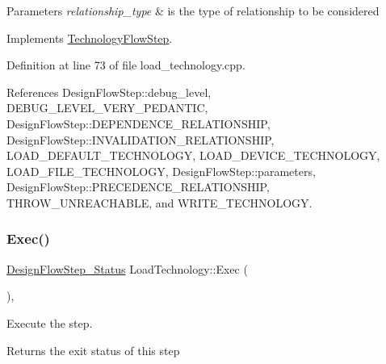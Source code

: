 \begin{DoxyParams}{Parameters}
{\em relationship\+\_\+type} & is the type of relationship to be considered \\
\hline
\end{DoxyParams}


Implements \hyperlink{classTechnologyFlowStep_ab543169c9b0143c8ae8831d765519075}{Technology\+Flow\+Step}.



Definition at line 73 of file load\+\_\+technology.\+cpp.



References Design\+Flow\+Step\+::debug\+\_\+level, D\+E\+B\+U\+G\+\_\+\+L\+E\+V\+E\+L\+\_\+\+V\+E\+R\+Y\+\_\+\+P\+E\+D\+A\+N\+T\+IC, Design\+Flow\+Step\+::\+D\+E\+P\+E\+N\+D\+E\+N\+C\+E\+\_\+\+R\+E\+L\+A\+T\+I\+O\+N\+S\+H\+IP, Design\+Flow\+Step\+::\+I\+N\+V\+A\+L\+I\+D\+A\+T\+I\+O\+N\+\_\+\+R\+E\+L\+A\+T\+I\+O\+N\+S\+H\+IP, L\+O\+A\+D\+\_\+\+D\+E\+F\+A\+U\+L\+T\+\_\+\+T\+E\+C\+H\+N\+O\+L\+O\+GY, L\+O\+A\+D\+\_\+\+D\+E\+V\+I\+C\+E\+\_\+\+T\+E\+C\+H\+N\+O\+L\+O\+GY, L\+O\+A\+D\+\_\+\+F\+I\+L\+E\+\_\+\+T\+E\+C\+H\+N\+O\+L\+O\+GY, Design\+Flow\+Step\+::parameters, Design\+Flow\+Step\+::\+P\+R\+E\+C\+E\+D\+E\+N\+C\+E\+\_\+\+R\+E\+L\+A\+T\+I\+O\+N\+S\+H\+IP, T\+H\+R\+O\+W\+\_\+\+U\+N\+R\+E\+A\+C\+H\+A\+B\+LE, and W\+R\+I\+T\+E\+\_\+\+T\+E\+C\+H\+N\+O\+L\+O\+GY.

\mbox{\label{classLoadTechnology_a53cfdf06974770ede80309e27d2e0a15}} 
\subsubsection{\texorpdfstring{Exec()}{Exec()}}
{\footnotesize\ttfamily \hyperlink{design__flow__step_8hpp_afb1f0d73069c26076b8d31dbc8ebecdf}{Design\+Flow\+Step\+\_\+\+Status} Load\+Technology\+::\+Exec (\begin{DoxyParamCaption}{ }\end{DoxyParamCaption})\hspace{0.3cm}{\ttfamily [override]}, {\ttfamily [virtual]}}



Execute the step. 

\begin{DoxyReturn}{Returns}
the exit status of this step 
\end{DoxyReturn}


